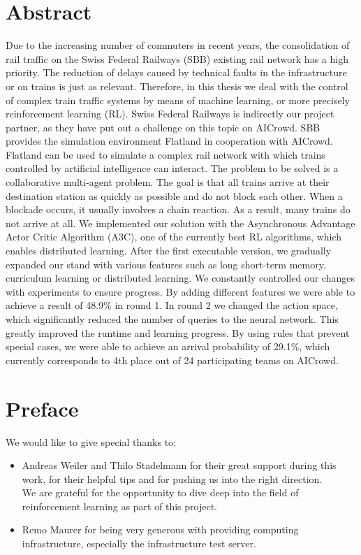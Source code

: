 \chapter*{Abstract}\label{abstract}
Due to the increasing number of commuters in recent years, the consolidation of rail traffic on the Swiss Federal Railways (SBB) existing rail network has a high priority.
The reduction of delays caused by technical faults in the infrastructure or on trains is just as relevant.
Therefore, in this thesis we deal with the control of complex train traffic systems by means of machine learning, or more precisely reinforcement learning (RL).
Swiss Federal Railways is indirectly our project partner, as they have put out a challenge on this topic on AICrowd.
SBB provides the simulation environment Flatland in cooperation with AICrowd. Flatland can be used to simulate a complex rail network with which trains controlled by artificial intelligence can interact.
The problem to be solved is a collaborative multi-agent problem. The goal is that all trains arrive at their destination station as quickly as possible and do not block each other. When a blockade occurs, it usually involves a chain reaction. As a result, many trains do not arrive at all.
We implemented our solution with the Asynchronous Advantage Actor Critic Algorithm (A3C), one of the currently best RL algorithms, which enables distributed learning.
After the first executable version, we gradually expanded our stand with various features such as long short-term memory, curriculum learning or distributed learning.
We constantly controlled our changes with experiments to ensure progress.
By adding different features we were able to achieve a result of 48.9\% in round 1.
In round 2 we changed the action space, which significantly reduced the number of queries to the neural network. This greatly improved the runtime and learning progress.
By using rules that prevent special cases, we were able to achieve an arrival probability of 29.1\%, which currently corresponds to 4th place out of 24 participating teams on AICrowd.


\chapter*{Preface}\label{preface}
We would like to give special thanks to:
\begin{itemize}
    \item Andreas Weiler and Thilo Stadelmann for their great support during this work, for their helpful tips and for pushing us into the right direction.\\
    We are grateful for the opportunity to dive deep into the field of reinforcement learning as part of this project.
    \item Remo Maurer for being very generous with providing computing infrastructure, especially the infrastructure test server.
\end{itemize}


